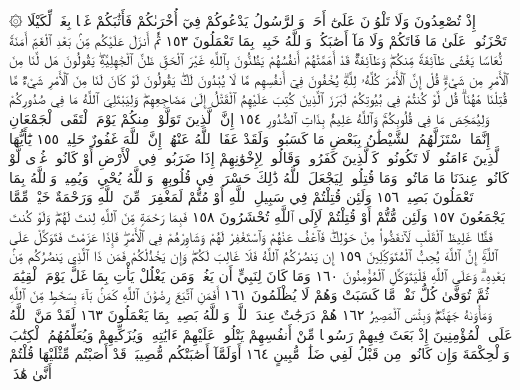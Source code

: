 ۞ إِذْ تُصْعِدُونَ وَلَا تَلْوُۥنَ عَلَىٰٓ أَحَدࣲ
وَٱلرَّسُولُ يَدْعُوكُمْ فِيٓ أُخْرَىٰكُمْ فَأَثَٰبَكُمْ
غَمَّۢا بِغَمࣲّ لِّكَيْلَا تَحْزَنُوا۟ عَلَىٰ مَا فَاتَكُمْ وَلَا
مَآ أَصَٰبَكُمْۗ وَٱللَّهُ خَبِيرُۢ بِمَا تَعْمَلُونَ ١٥٣
ثُمَّ أَنزَلَ عَلَيْكُم مِّنۢ بَعْدِ ٱلْغَمِّ أَمَنَةࣰ نُّعَاسࣰا يَغْشَىٰ طَآئِفَةࣰ
مِّنكُمْۖ وَطَآئِفَةࣱ قَدْ أَهَمَّتْهُمْ أَنفُسُهُمْ يَظُنُّونَ بِٱللَّهِ غَيْرَ
ٱلْحَقِّ ظَنَّ ٱلْجَٰهِلِيَّةِۖ يَقُولُونَ هَل لَّنَا مِنَ ٱلْأَمْرِ مِن شَيْءࣲۗ
قُلْ إِنَّ ٱلْأَمْرَ كُلَّهُۥ لِلَّهِۗ يُخْفُونَ فِيٓ أَنفُسِهِم مَّا لَا يُبْدُونَ لَكَۖ
يَقُولُونَ لَوْ كَانَ لَنَا مِنَ ٱلْأَمْرِ شَيْءࣱ مَّا قُتِلْنَا هَٰهُنَاۗ قُل لَّوْ كُنتُمْ
فِي بُيُوتِكُمْ لَبَرَزَ ٱلَّذِينَ كُتِبَ عَلَيْهِمُ ٱلْقَتْلُ إِلَىٰ مَضَاجِعِهِمْۖ
وَلِيَبْتَلِيَ ٱللَّهُ مَا فِي صُدُورِكُمْ وَلِيُمَحِّصَ مَا فِي قُلُوبِكُمْۚ
وَٱللَّهُ عَلِيمُۢ بِذَاتِ ٱلصُّدُورِ ١٥٤ إِنَّ ٱلَّذِينَ تَوَلَّوْا۟ مِنكُمْ
يَوْمَ ٱلْتَقَى ٱلْجَمْعَانِ إِنَّمَا ٱسْتَزَلَّهُمُ ٱلشَّيْطَٰنُ بِبَعْضِ
مَا كَسَبُوا۟ۖ وَلَقَدْ عَفَا ٱللَّهُ عَنْهُمْۗ إِنَّ ٱللَّهَ غَفُورٌ حَلِيمࣱ ١٥٥ يَٰٓأَيُّهَا
ٱلَّذِينَ ءَامَنُوا۟ لَا تَكُونُوا۟ كَٱلَّذِينَ كَفَرُوا۟ وَقَالُوا۟ لِإِخْوَٰنِهِمْ إِذَا
ضَرَبُوا۟ فِي ٱلْأَرْضِ أَوْ كَانُوا۟ غُزࣰّى لَّوْ كَانُوا۟ عِندَنَا مَا مَاتُوا۟
وَمَا قُتِلُوا۟ لِيَجْعَلَ ٱللَّهُ ذَٰلِكَ حَسْرَةࣰ فِي قُلُوبِهِمْۗ وَٱللَّهُ يُحْيِۦ
وَيُمِيتُۗ وَٱللَّهُ بِمَا تَعْمَلُونَ بَصِيرࣱ ١٥٦ وَلَئِن قُتِلْتُمْ فِي سَبِيلِ
ٱللَّهِ أَوْ مُتُّمْ لَمَغْفِرَةࣱ مِّنَ ٱللَّهِ وَرَحْمَةٌ خَيْرࣱ مِّمَّا يَجْمَعُونَ ١٥٧
وَلَئِن مُّتُّمْ أَوْ قُتِلْتُمْ لَإِلَى ٱللَّهِ تُحْشَرُونَ ١٥٨ فَبِمَا رَحْمَةࣲ مِّنَ ٱللَّهِ
لِنتَ لَهُمْۖ وَلَوْ كُنتَ فَظًّا غَلِيظَ ٱلْقَلْبِ لَٱنفَضُّوا۟ مِنْ حَوْلِكَۖ
فَٱعْفُ عَنْهُمْ وَٱسْتَغْفِرْ لَهُمْ وَشَاوِرْهُمْ فِي ٱلْأَمْرِۖ فَإِذَا عَزَمْتَ
فَتَوَكَّلْ عَلَى ٱللَّهِۚ إِنَّ ٱللَّهَ يُحِبُّ ٱلْمُتَوَكِّلِينَ ١٥٩ إِن يَنصُرْكُمُ ٱللَّهُ
فَلَا غَالِبَ لَكُمْۖ وَإِن يَخْذُلْكُمْ فَمَن ذَا ٱلَّذِي يَنصُرُكُم مِّنۢ
بَعْدِهِۦۗ وَعَلَى ٱللَّهِ فَلْيَتَوَكَّلِ ٱلْمُؤْمِنُونَ ١٦٠ وَمَا كَانَ لِنَبِيٍّ أَن
يَغُلَّۚ وَمَن يَغْلُلْ يَأْتِ بِمَا غَلَّ يَوْمَ ٱلْقِيَٰمَةِۚ ثُمَّ تُوَفَّىٰ كُلُّ
نَفْسࣲ مَّا كَسَبَتْ وَهُمْ لَا يُظْلَمُونَ ١٦١ أَفَمَنِ ٱتَّبَعَ رِضْوَٰنَ ٱللَّهِ
كَمَنۢ بَآءَ بِسَخَطࣲ مِّنَ ٱللَّهِ وَمَأْوَىٰهُ جَهَنَّمُۖ وَبِئْسَ ٱلْمَصِيرُ ١٦٢
هُمْ دَرَجَٰتٌ عِندَ ٱللَّهِۗ وَٱللَّهُ بَصِيرُۢ بِمَا يَعْمَلُونَ ١٦٣ لَقَدْ
مَنَّ ٱللَّهُ عَلَى ٱلْمُؤْمِنِينَ إِذْ بَعَثَ فِيهِمْ رَسُولࣰا مِّنْ أَنفُسِهِمْ
يَتْلُوا۟ عَلَيْهِمْ ءَايَٰتِهِۦ وَيُزَكِّيهِمْ وَيُعَلِّمُهُمُ ٱلْكِتَٰبَ
وَٱلْحِكْمَةَ وَإِن كَانُوا۟ مِن قَبْلُ لَفِي ضَلَٰلࣲ مُّبِينٍ ١٦٤ أَوَلَمَّآ
أَصَٰبَتْكُم مُّصِيبَةࣱ قَدْ أَصَبْتُم مِّثْلَيْهَا قُلْتُمْ أَنَّىٰ هَٰذَاۖ
